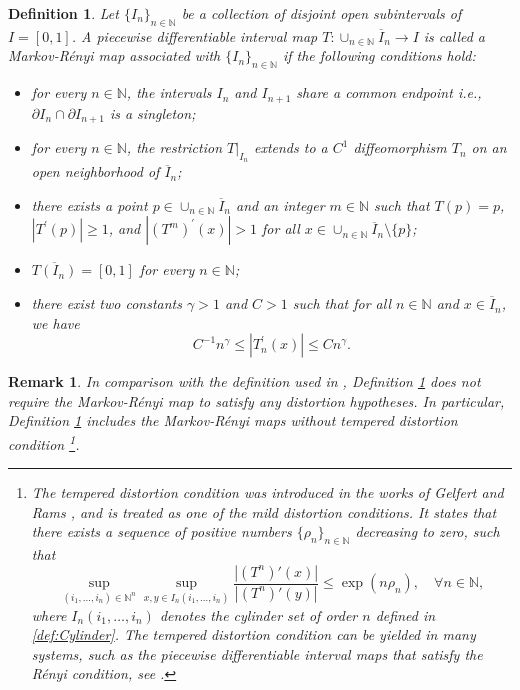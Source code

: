 \documentclass[12pt,reqno]{amsart}
\renewcommand{\=}{\coloneqq}
\theoremstyle{plain}
\newtheorem{definition}[theorem]{Definition}
\newtheorem{remark}[theorem]{Remark}
\begin{document}
\begin{definition}\label{def:MR}
Let $\{I_n\}_{n \in \mathbb N}$ be a collection of disjoint open subintervals of $I=[0,1]$.
A piecewise differentiable interval map $T: \cup_{n \in \mathbb N}\overline{I}_n \to I$ is called a \emph{Markov-R\'{e}nyi map} associated with $\{I_n\}_{n \in \mathbb N}$ if the following conditions hold:
\begin{itemize}
    \item[(1).] for every $n\in \mathbb{N}$, the intervals $I_n$ and $I_{n+1}$ share a common endpoint i.e., $\partial I_{n}\cap\partial I_{n+1}$ is a singleton;
     \item[(2).] for every $n\in \mathbb{N}$, the restriction $T|_{I_n}$ extends to a $C^{1}$ diffeomorphism $T_n$ on an open neighborhood of $\overline{I}_n$;
    \item[(3).] there exists a point $p \in \cup_{n \in \mathbb N}\overline{I}_n$ and an integer $m\in \mathbb{N}$ such that $T(p)=p$, $|T^\prime(p)| \geq 1$, and $|(T^m)^\prime(x)|>1$ for all $x\in \cup_{n \in \mathbb N}\overline{I}_n\setminus \{p\}$;
    \item[(4).] $\overline{T(I_n)}=[0,1]$ for every $n\in \mathbb{N}$;
    \item[(5).] there exist two constants $\gamma>1$ and $C>1$ such that for all $n \in \mathbb{N}$ and $x \in \overline{I}_n$, we have
    \begin{equation*}
        C^{-1}n^{\gamma}\leq |T^\prime_n(x)|\leq Cn^{\gamma}.
    \end{equation*}
\end{itemize}
\end{definition}


\begin{remark}
In comparison with the definition used in \cite[Section 2]{Iommi}, Definition \ref{def:MR} does not require the Markov-R\'{e}nyi map to satisfy any distortion hypotheses. In particular, Definition \ref{def:MR} includes the Markov-R\'{e}nyi maps without tempered distortion condition \footnote{The tempered distortion condition was introduced in the works of Gelfert and Rams \cite{GR1,GR}, and is treated as one of the mild distortion conditions. It states that there exists a sequence of positive numbers $\{\rho_{n}\}_{n\in\mathbb{N}}$ decreasing to zero, such that
\begin{equation}\label{equ:tempered}
\sup_{(i_{1},\dots,i_{n})\in\mathbb{N}^{n}}\sup_{x,y\in I_{n}(i_{1},\dots,i_{n})}\frac{|(T^{n})'(x)|}{|(T^{n})'(y)|}\leq \exp(n\rho_{n}), \quad \forall n\in\mathbb{N},
\end{equation}
where $I_{n}(i_{1},\dots,i_{n})$ denotes the cylinder set of order $n$ defined in \eqref{def:Cylinder}. The tempered distortion condition can be yielded in many systems, such as the piecewise differentiable interval maps that satisfy the R\'{e}nyi condition, see \cite{PW}.}.
\end{remark}
\end{document}
